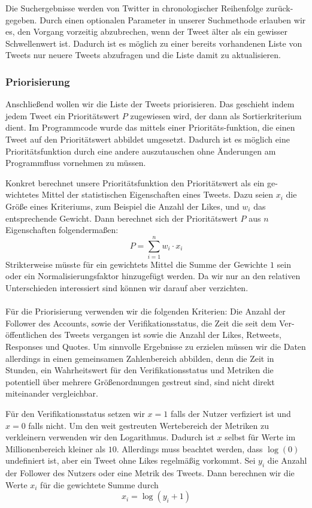 \documentclass[runningheads]{llncs}
\begin{document}
Die Suchergebnisse werden von Twitter in chronologischer Reihenfolge zurück-gegeben.
Durch einen optionalen Parameter in unserer Suchmethode erlauben wir es, den Vorgang vorzeitig abzubrechen, wenn der Tweet älter als ein gewisser Schwellenwert ist.
Dadurch ist es möglich zu einer bereits vorhandenen Liste von Tweets nur neuere Tweets abzufragen und die Liste damit zu aktualisieren.

\subsubsection{Priorisierung}
Anschließend wollen wir die Liste der Tweets priorisieren.
Das geschieht indem jedem Tweet ein Prioritätswert $P$ zugewiesen wird, der dann als Sortierkriterium dient.
Im Programmcode wurde das mittels einer Prioritäts-funktion, die einen Tweet auf den Prioritätswert abbildet umgesetzt.
Dadurch ist es möglich eine Prioritätsfunktion durch eine andere auszutauschen ohne Änderungen am Programmfluss vornehmen zu müssen.

Konkret berechnet unsere Prioritätsfunktion den Prioritätswert als ein ge-wichtetes Mittel der statistischen Eigenschaften eines Tweets.
Dazu seien $x_i$ die Größe eines Kriteriums, zum Beispiel die Anzahl der Likes, und $w_i$ das entsprechende Gewicht.
Dann berechnet sich der Prioritätswert $P$ aus $n$ Eigenschaften folgendermaßen:
$$
    P = \sum_{i=1}^n w_i \cdot x_i
$$
Strikterweise müsste für ein gewichtets Mittel die Summe der Gewichte $1$ sein oder ein Normalisierungsfaktor hinzugefügt werden.
Da wir nur an den relativen Unterschieden interessiert sind können wir darauf aber verzichten.

\paragraph{} Für die Priorisierung verwenden wir die folgenden Kriterien:
Die Anzahl der\\Follower des Accounts, sowie der Verifikationsstatus, die Zeit die seit dem Ver-öffentlichen des Tweets vergangen ist sowie die Anzahl der Likes, Retweets, Responses und Quotes.
Um sinnvolle Ergebnisse zu erzielen müssen wir die Daten allerdings in einen gemeinsamen Zahlenbereich abbilden, denn die Zeit in Stunden, ein Wahrheitswert für den Verifikationsstatus und Metriken die potentiell über mehrere Größenordnungen gestreut sind, sind nicht direkt miteinander vergleichbar.

Für den Verifikationsstatus setzen wir $x=1$ falls der Nutzer verfiziert ist und $x=0$ falls nicht.
Um den weit gestreuten Wertebereich der Metriken zu verkleinern verwenden wir den Logarithmus.
Dadurch ist $x$ selbst für Werte im Millionenbereich kleiner als $10$.
Allerdings muss beachtet werden, dass $\log(0)$ undefiniert ist, aber ein Tweet ohne Likes regelmäßig vorkommt.
Sei $y_i$ die Anzahl der Follower des Nutzers oder eine Metrik des Tweets.
Dann berechnen wir die Werte $x_i$ für die gewichtete Summe durch
$$
    x_i = \log(y_i + 1)
$$
\end{document}
